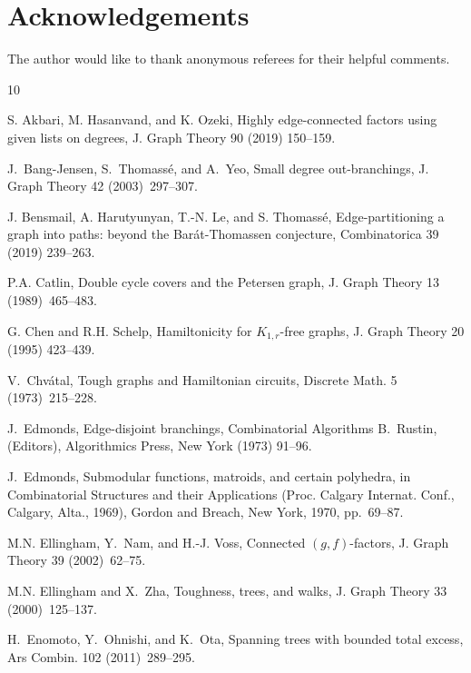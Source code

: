 \documentclass[10pt,bezier]{article}
\begin{document}
\section{Acknowledgements}
%
The author would like to thank anonymous referees for their helpful comments.
%
%
%
%
%
%
%
%
%
%
%
\begin{thebibliography}{10}

S. Akbari, M. Hasanvand, and K. Ozeki, Highly edge-connected factors using given
lists on degrees, J. Graph Theory 90 (2019) 150--159.

 J.~Bang-Jensen, S.~Thomass{\'e}, and A.~Yeo, Small degree out-branchings, J. Graph Theory 42 (2003)~297--307.

J. Bensmail, A. Harutyunyan, T.-N. Le, and S. Thomass\'e,
Edge-partitioning a graph into paths: beyond the Barát-Thomassen conjecture, Combinatorica 39 (2019) 239--263.


P.A. Catlin, Double cycle covers and the {P}etersen graph, J. Graph Theory 13 (1989)~465--483.


G. Chen and R.H. Schelp, Hamiltonicity for $K_{1,r}$-free graphs, J. Graph Theory 20 (1995) 423--439.

 V.~Chv\'atal, Tough graphs and {H}amiltonian circuits, Discrete Math. 5 (1973)~215--228.

 J.~Edmonds, Edge-disjoint branchings, Combinatorial Algorithms B.~Rustin, (Editors), Algorithmics Press, New York (1973) 91--96.

 J.~Edmonds, 
 Submodular functions, matroids, and certain polyhedra,
 in Combinatorial {S}tructures and their {A}pplications ({P}roc. {C}algary {I}nternat. {C}onf., {C}algary,
 {A}lta., 1969), Gordon and Breach, New York, 1970, pp.~69--87.

 M.N. Ellingham, Y.~Nam, and H.-J. Voss, Connected {$(g,f)$}-factors, J. Graph Theory 39 (2002)~62--75.

 M.N. Ellingham and X.~Zha, Toughness, trees, and walks, J. Graph Theory 33 (2000)~125--137.

 H.~Enomoto, Y.~Ohnishi, and K.~Ota, Spanning trees with bounded total excess, Ars Combin. 102 (2011)~289--295.


\end{thebibliography}
\end{document}
